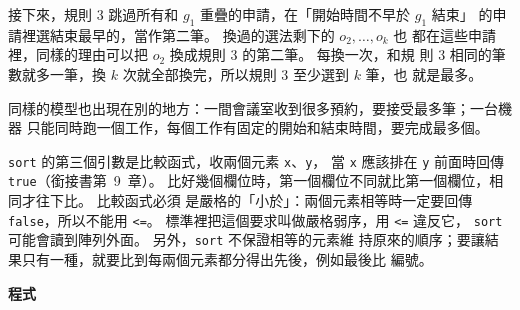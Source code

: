\begin{center}
\label{fig:swap-g1}
\end{center}

接下來，規則 3 跳過所有和 $g_1$ 重疊的申請，在「開始時間不早於 $g_1$ 結束」
的申請裡選結束最早的，當作第二筆。 換過的選法剩下的 $o_2, \ldots, o_k$ 也
都在這些申請裡，同樣的理由可以把 $o_2$ 換成規則 3 的第二筆。 每換一次，和規
則 3 相同的筆數就多一筆，換 $k$ 次就全部換完，所以規則 3 至少選到 $k$ 筆，也
就是最多。

同樣的模型也出現在別的地方：一間會議室收到很多預約，要接受最多筆；一台機器
只能同時跑一個工作，每個工作有固定的開始和結束時間，要完成最多個。

\begin{bridgerecap}[多個欄位的比較函式]
\texttt{sort} 的第三個引數是比較函式，收兩個元素 \texttt{x}、\texttt{y}，
當 \texttt{x} 應該排在 \texttt{y} 前面時回傳 \texttt{true}（銜接書第~9~章）。
比好幾個欄位時，第一個欄位不同就比第一個欄位，相同才往下比。 比較函式必須
是嚴格的「小於」：兩個元素相等時一定要回傳 \texttt{false}，所以不能用
\texttt{<=}。 標準裡把這個要求叫做嚴格弱序，用 \texttt{<=} 違反它，
\texttt{sort} 可能會讀到陣列外面。 另外，\texttt{sort} 不保證相等的元素維
持原來的順序；要讓結果只有一種，就要比到每兩個元素都分得出先後，例如最後比
編號。
\end{bridgerecap}

\textbf{程式}

